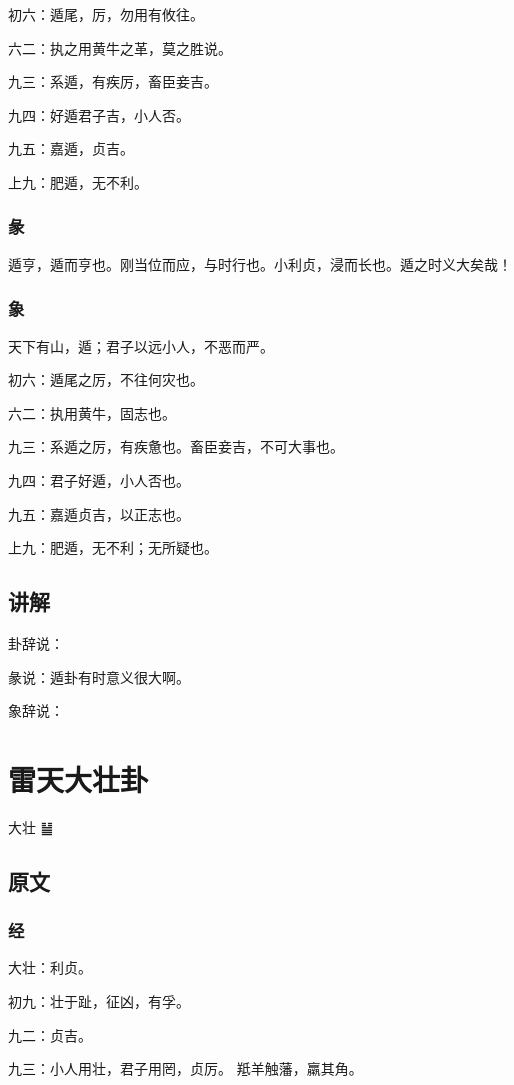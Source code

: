 \documentclass[12pt,oneside]{book}
\begin{document}
初六：遁尾，厉，勿用有攸往。

六二：执之用黄牛之革，莫之胜说。

九三：系遁，有疾厉，畜臣妾吉。

九四：好遁君子吉，小人否。

九五：嘉遁，贞吉。

上九：肥遁，无不利。

\subsection{彖}
遁亨，遁而亨也。刚当位而应，与时行也。小利贞，浸而长也。遁之时义大矣哉！

\subsection{象}
天下有山，遁；君子以远小人，不恶而严。

初六：遁尾之厉，不往何灾也。

六二：执用黄牛，固志也。

九三：系遁之厉，有疾惫也。畜臣妾吉，不可大事也。

九四：君子好遁，小人否也。

九五：嘉遁贞吉，以正志也。

上九：肥遁，无不利；无所疑也。

\section{讲解}
卦辞说：

彖说：遁卦有时意义很大啊。

象辞说：


\chapter{雷天大壮卦}
大壮 {\Large ䷡}

\section{原文}

\subsection{经}
大壮：利贞。

初九：壮于趾，征凶，有孚。

九二：贞吉。

九三：小人用壮，君子用罔，贞厉。 羝羊触藩，羸其角。
\end{document}
